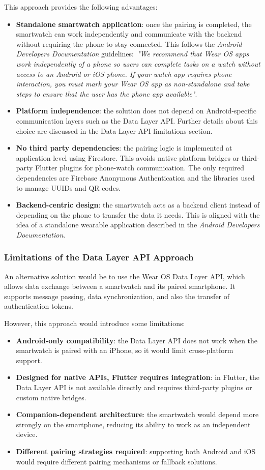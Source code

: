 This approach provides the following advantages:
\begin{itemize}
\item \textbf{Standalone smartwatch application}: once the pairing is completed, the smartwatch can work independently and communicate with the backend without requiring the phone to stay connected. This follows the \textit{Android Developers Documentation} guidelines:\ \textit{"We recommend that Wear OS apps work independently of a phone so users can complete tasks on a watch without access to an Android or iOS phone. If your watch app requires phone interaction, you must mark your Wear OS app as non-standalone and take steps to ensure that the user has the phone app available"}.
\item \textbf{Platform independence}: the solution does not depend on Android-specific communication layers such as the Data Layer API. Further details about this choice are discussed in the Data Layer API limitations section.
\item \textbf{No third party dependencies}: the pairing logic is implemented at application level using Firestore. This avoids native platform bridges or third-party Flutter plugins for phone-watch communication. The only required dependencies are Firebase Anonymous Authentication and the libraries used to manage UUIDs and QR codes.
\item \textbf{Backend-centric design}: the smartwatch acts as a backend client instead of depending on the phone to transfer the data it needs. This is aligned with the idea of a standalone wearable application described in the \textit{Android Developers Documentation}.
\end{itemize} \newpage

\subsubsection{Limitations of the Data Layer API Approach}
An alternative solution would be to use the Wear OS Data Layer API, which allows data exchange between a smartwatch and its paired smartphone. It supports message passing, data synchronization, and also the transfer of authentication tokens.

However, this approach would introduce some limitations:
\begin{itemize}
\item \textbf{Android-only compatibility}: the Data Layer API does not work when the smartwatch is paired with an iPhone, so it would limit cross-platform support.
\item \textbf{Designed for native APIs, Flutter requires integration}: in Flutter, the Data Layer API is not available directly and requires third-party plugins or custom native bridges.
\item \textbf{Companion-dependent architecture}: the smartwatch would depend more strongly on the smartphone, reducing its ability to work as an independent device.
\item \textbf{Different pairing strategies required}: supporting both Android and iOS would require different pairing mechanisms or fallback solutions.
\end{itemize}

